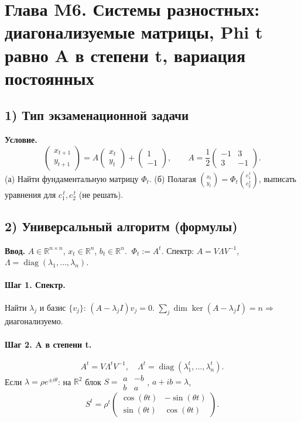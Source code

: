 \section{Глава M6. Системы разностных: диагонализуемые матрицы, Phi t равно A в степени t, вариация постоянных}

\subsection*{1) Тип экзаменационной задачи}
\textbf{Условие.}
\[
\begin{pmatrix} x_{t+1}\\[2pt] y_{t+1} \end{pmatrix}
= A \begin{pmatrix} x_{t}\\[2pt] y_{t} \end{pmatrix}
+ \begin{pmatrix} 1\\[2pt] -1 \end{pmatrix}, 
\qquad 
A=\frac12\begin{pmatrix} -1 & 3\\[2pt] 3 & -1 \end{pmatrix}.
\]
(а) Найти фундаментальную матрицу \(\Phi_t\).
(б) Полагая \(\binom{x_t}{y_t}=\Phi_t\binom{c_1^{\,t}}{c_2^{\,t}}\), выписать уравнения для \(c_1^{\,t},c_2^{\,t}\) (не решать).

\subsection*{2) Универсальный алгоритм (формулы)}
\textbf{Ввод.} \(A\in\mathbb R^{n\times n}\), \(x_t\in\mathbb R^n\), \(b_t\in\mathbb R^n\). \(\ \Phi_t:=A^t\).
Спектр: \(A=V\Lambda V^{-1}\), \(\Lambda=\operatorname{diag}(\lambda_1,\dots,\lambda_n)\).

\paragraph{Шаг 1. Спектр.}
Найти \(\lambda_j\) и базис \(\{v_j\}\): \((A-\lambda_j I)v_j=0\). \(\sum_j \dim\ker(A-\lambda_j I)=n\Rightarrow\) диагонализуемо.

\paragraph{Шаг 2. A в степени t.}
\[
A^t=V\Lambda^tV^{-1},\quad \Lambda^t=\operatorname{diag}(\lambda_1^t,\dots,\lambda_n^t).
\]
Если \(\lambda=\rho e^{\pm i\theta}\): на \(\mathbb R^2\) блок \(S=\begin{smallmatrix}a&-b\\ b&a\end{smallmatrix}\), \(a+ib=\lambda\), 
\[
S^t=\rho^t\begin{pmatrix}\cos(\theta t)&-\sin(\theta t)\\ \sin(\theta t)&\cos(\theta t)\end{pmatrix}.
\]

